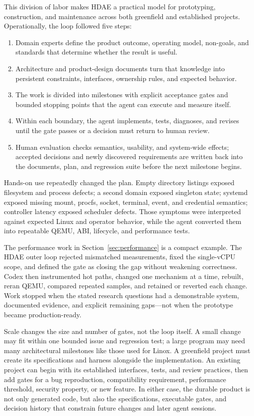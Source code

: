 \documentclass[11pt]{article}
\begin{document}
This division of labor makes HDAE a practical model for prototyping,
construction, and maintenance across both greenfield and established projects.
Operationally, the loop followed five steps:

\begin{enumerate}[leftmargin=*,label=\arabic*.,topsep=0.4em,itemsep=0.25em,parsep=0pt]
\item Domain experts define the product outcome, operating model, non-goals,
  and standards that determine whether the result is useful.
\item Architecture and product-design documents turn that knowledge into
  persistent constraints, interfaces, ownership rules, and expected behavior.
\item The work is divided into milestones with explicit acceptance gates and
  bounded stopping points that the agent can execute and measure itself.
\item Within each boundary, the agent implements, tests, diagnoses, and revises
  until the gate passes or a decision must return to human review.
\item Human evaluation checks semantics, usability, and system-wide effects;
  accepted decisions and newly discovered requirements are written back into
  the documents, plan, and regression suite before the next milestone begins.
\end{enumerate}

Hands-on use repeatedly changed the plan. Empty directory listings exposed
filesystem and process defects; a second domain exposed singleton state;
systemd exposed missing mount, procfs, socket, terminal, event, and credential
semantics; controller latency exposed scheduler defects. Those symptoms were
interpreted against expected Linux and operator behavior, while the agent
converted them into repeatable QEMU, ABI, lifecycle, and performance tests.

The performance work in Section~\ref{sec:performance} is a compact example.
The HDAE outer loop rejected mismatched measurements, fixed the single-vCPU scope,
and defined the gate as closing the gap without weakening correctness. Codex
then instrumented hot paths, changed one mechanism at a time, rebuilt, reran
QEMU, compared repeated samples, and retained or reverted each change. Work
stopped when the stated research questions had a demonstrable system,
documented evidence, and explicit remaining gaps---not when the prototype
became production-ready.

Scale changes the size and number of gates, not the loop itself. A small change
may fit within one bounded issue and regression test; a large program may need
many architectural milestones like those used for Linox. A greenfield project
must create its specifications and harness alongside the implementation. An
existing project can begin with its established interfaces, tests, and review
practices, then add gates for a bug reproduction, compatibility requirement,
performance threshold, security property, or new feature. In either case, the
durable product is not only generated code, but also the specifications,
executable gates, and decision history that constrain future changes and later
agent sessions.
\end{document}
